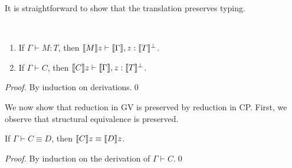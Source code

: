 \documentclass[oribibl,orivec,envcountsame]{llncs}
\begin{document}


It is straightforward to show that the translation preserves typing.
\begin{theorem}
~
\begin{enumerate}
\item If $\Gamma \vdash M : T$, then $\llbracket M \rrbracket z \vdash \llbracket \Gamma \rrbracket, z:\llbracket T \rrbracket^\perp$.
\item If $\Gamma \vdash C$, then $\llbracket C \rrbracket z \vdash \llbracket \Gamma \rrbracket, z:\llbracket T \rrbracket^\perp$.
\end{enumerate}
\end{theorem}
\begin{proof}
By induction on derivations.\qed
\end{proof}

We now show that reduction in GV is preserved by reduction in CP. First, we observe that structural
equivalence is preserved.
%
\begin{theorem}
If $\Gamma \vdash C \equiv D$, then $\llbracket C \rrbracket z \equiv \llbracket D \rrbracket z$.
\end{theorem}
%
\begin{proof}
By induction on the derivation of $\Gamma \vdash C$.\qed
\end{proof}
\end{document}
